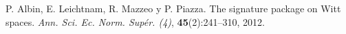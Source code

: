 \begin{thebibliography}{99}

 P. Albin, E. Leichtnam, R. Mazzeo y P. Piazza. The signature package on Witt spaces. \textit{Ann. Sci. Ec. Norm. Supér. (4)}, \textbf{45}(2):241--310, 2012.
%
%
%


\end{thebibliography}
